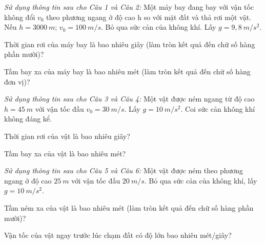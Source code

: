 \textit{Sử dụng thông tin sau cho Câu 1 và Câu 2:} Một máy bay đang bay với vận tốc không đổi $v_0$ theo phương ngang ở độ cao h so với mặt đất và thả rơi một vật. Nếu $h=3000\ m$; $v_0=100\ m/s$. Bỏ qua sức cản của không khí. Lấy $g=9,8\ m/s^2$.
\begin{ex}%
Thời gian rơi của máy bay là bao nhiêu giây (làm tròn kết quả đến chữ số hàng phần mười)?
\loigiai{}
\end{ex}
\begin{ex}%
Tầm bay xa của máy bay là bao nhiêu mét (làm tròn kết quả đến chữ số hàng đơn vị)?
\end{ex}
\textit{Sử dụng thông tin sau cho Câu 3 và Câu 4:} Một vật được ném ngang từ độ cao $h=45\ m$ với vận tốc đầu $v_0=30\ m/s$. Lấy $g=10\ m/s^2$. Coi sức cản không khí không đáng kể.
\begin{ex}%
Thời gian rơi của vật là bao nhiêu giây?
\loigiai{}
\end{ex}
\begin{ex}%
Tầm bay xa của vật là bao nhiêu mét?
\end{ex}
\textit{Sử dụng thông tin sau cho Câu 5 và Câu 6:} Một vật được ném theo phương ngang ở độ cao $25\ m$ với vận tốc đầu $20\ m/s$. Bỏ qua sức cản của không khí, lấy $g=10\ m/s^2$.
\begin{ex}%
Tầm ném xa của vật là bao nhiêu mét (làm tròn kết quả đến chữ số hàng phần mười)?
\loigiai{}
\end{ex}
\begin{ex}%
Vận tốc của vật ngay trước lúc chạm đất có độ lớn bao nhiêu mét/giây?
\end{ex}